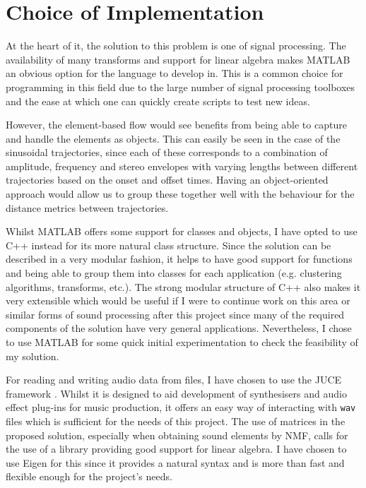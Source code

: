 \documentclass[12pt,a4paper,twoside,openright]{report}
\begin{document}
\section{Choice of Implementation}

At the heart of it, the solution to this problem is one of signal processing. The availability of many transforms and support for linear algebra makes MATLAB an obvious option for the language to develop in. This is a common choice for programming in this field due to the large number of signal processing toolboxes and the ease at which one can quickly create scripts to test new ideas.

However, the element-based flow would see benefits from being able to capture and handle the elements as objects. This can easily be seen in the case of the sinusoidal trajectories, since each of these corresponds to a combination of amplitude, frequency and stereo envelopes with varying lengths between different trajectories based on the onset and offset times. Having an object-oriented approach would allow us to group these together well with the behaviour for the distance metrics between trajectories.

Whilst MATLAB offers some support for classes and objects, I have opted to use C++ instead for its more natural class structure. Since the solution can be described in a very modular fashion, it helps to have good support for functions and being able to group them into classes for each application (e.g. clustering algorithms, transforms, etc.). The strong modular structure of C++ also makes it very extensible which would be useful if I were to continue work on this area or similar forms of sound processing after this project since many of the required components of the solution have very general applications. Nevertheless, I chose to use MATLAB for some quick initial experimentation to check the feasibility of my solution.

For reading and writing audio data from files, I have chosen to use the JUCE framework \cite{juce}. Whilst it is designed to aid development of synthesisers and audio effect plug-ins for music production, it offers an easy way of interacting with \texttt{wav} files which is sufficient for the needs of this project. The use of matrices in the proposed solution, especially when obtaining sound elements by NMF, calls for the use of a library providing good support for linear algebra. I have chosen to use Eigen for this since it provides a natural syntax and is more than fast and flexible enough for the project's needs.
\end{document}
